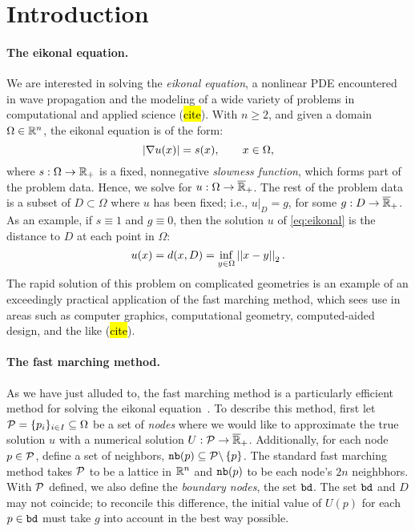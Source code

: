\documentclass[eikonal.tex]{subfiles}
\begin{document}
\section{Introduction}\label{sec:intro}

\paragraph{The eikonal equation.} We are interested in solving the
\emph{eikonal equation}, a nonlinear PDE encountered in wave
propagation and the modeling of a wide variety of problems in
computational and applied science (\hl{cite}). With $n \geq 2$, and
given a domain $\Omega \in \mathbb{R}^n$, the eikonal equation is of the form:
\begin{equation}\label{eq:eikonal}
  \abs{\nabla u(x)} = s(x), \qquad x \in \Omega,
\end{equation}
where $s : \Omega \to \mathbb{R}_+$ is a fixed, nonnegative \emph{slowness
  function}, which forms part of the problem data. Hence, we solve for
$u : \Omega \to \overline{\mathbb{R}}_+$. The rest of the problem data is a
subset of $D \subset \Omega$ where $u$ has been fixed; i.e.,
$\left. u \right|_D = g$, for some $g : D \to \overline{\mathbb{R}}_+$. As an
example, if $s \equiv 1$ and $g \equiv 0$, then the solution $u$ of
\cref{eq:eikonal} is the distance to $D$ at each point in $\Omega$:
\begin{equation}
  \label{eq:distance-to-Omega}
  u(x) = d(x, D) = \inf_{y \in \Omega} \norm{x - y}_2.
\end{equation}
The rapid solution of this problem on complicated geometries is an
example of an exceedingly practical application of the fast marching
method, which sees use in areas such as computer graphics,
computational geometry, computed-aided design, and the like
(\hl{cite}).

\paragraph{The fast marching method.} As we have just alluded to, the
fast marching method is a particularly efficient method for solving
the eikonal equation~\cite{sethian1999level}. To describe this method,
first let $\mathcal{P} = \{p_i\}_{i \in I} \subseteq \Omega$ be a set of
\emph{nodes} where we would like to approximate the true solution $u$
with a numerical solution $U : \mathcal{P} \to
\overline{\mathbb{R}}_+$. Additionally, for each node $p \in \mathcal{P}$,
define a set of neighbors,
$\texttt{nb}(p) \subseteq \mathcal{P} \backslash \left\{p\right\}$. The standard fast
marching method takes $\mathcal{P}$ to be a lattice in $\mathbb{R}^n$ and $\texttt{nb}(p)$
to be each node's $2n$ neighbhors. With $\mathcal{P}$ defined, we also
define the \emph{boundary nodes}, the set $\texttt{bd}$. The set
$\texttt{bd}$ and $D$ may not coincide; to reconcile this difference,
the initial value of $U(p)$ for each $p \in \texttt{bd}$ must take $g$
into account in the best way possible.
\end{document}
